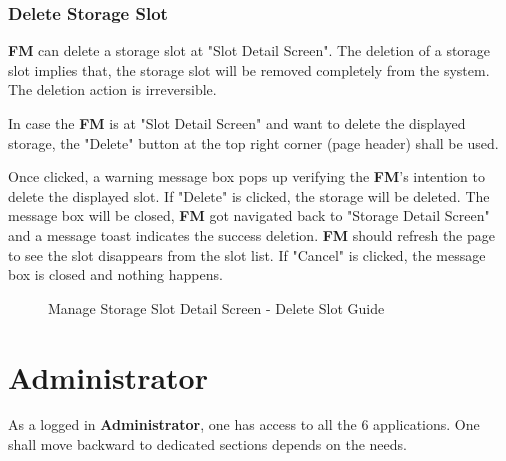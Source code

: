\subsubsection{Delete Storage Slot}

\textbf{FM} can delete a storage slot at "Slot Detail Screen". 
The deletion of a storage slot implies that, the storage slot will be removed completely from the system. The deletion action is irreversible. 

In case the \textbf{FM} is at "Slot Detail Screen" and want to delete the displayed storage, the "Delete" button at the top right corner (page header) shall be used. 

Once clicked, a warning message box pops up verifying the \textbf{FM}'s intention to delete the displayed slot. If "Delete" is clicked, the storage will be deleted. The message box will be closed, \textbf{FM} got navigated back to "Storage Detail Screen" and a message toast indicates the success deletion. \textbf{FM} should refresh the page to see the slot disappears from the slot list. If "Cancel" is clicked, the message box is closed and nothing happens.

\begin{figure}[H]
	\centering

    \vspace{10pt}
    
    \caption{Manage Storage Slot Detail Screen - Delete Slot Guide}
	\label{fig:MSslotObjDeleteGuide}
\end{figure}


\pagebreak



\section{Administrator}
As a logged in \textbf{Administrator}, one has access to all the 6 applications. One shall move backward to dedicated sections depends on the needs. 